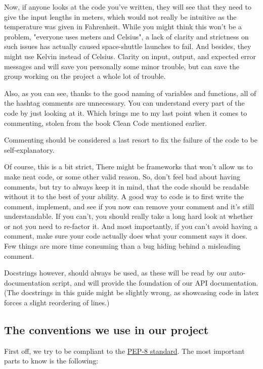 \documentclass[10pt,a4paper]{article}
\begin{document}
Now, if anyone looks at the code you've written, they will see that they need to give the input lengths in meters, which would not really be intuitive as the temperature was given in Fahrenheit. While you might think this won't be a problem, "everyone uses meters and Celsius", a lack of clarity and strictness on such issues has actually caused space-shuttle launches to fail. And besides, they might use Kelvin instead of Celsius. Clarity on input, output, and expected error messages and will save you personally some minor trouble, but can save the group working on the project a whole lot of trouble. 

Also, as you can see, thanks to the good naming of variables and functions, all of the hashtag comments are unnecessary. You can understand every part of the code by just looking at it. Which brings me to my last point when it comes to commenting, stolen from the book Clean Code mentioned earlier.

Commenting should be considered a last resort to fix the failure of the code to be self-explanatory.

Of course, this is a bit strict, There might be frameworks that won't allow us to make neat code, or some other valid reason. So, don't feel bad about having comments, but try to always keep it in mind, that the code should be readable without it to the best of your ability. A good way to code is to first write the comment, implement, and see if you now can remove your comment and it's still understandable. If you can't, you should really take a long hard look at whether or not you need to re-factor it. And most importantly, if you can't avoid having a comment, make sure your code actually does what your comment says it does. Few things are more time consuming than a bug hiding behind a misleading comment. 

Docstrings however, should always be used, as these will be read by our auto-documentation script, and will provide the foundation of our API documentation. (The docstrings in this guide might be slightly wrong, as showcasing code in latex forces a slight reordering of lines.)

\subsection{The conventions we use in our project}

First off, we try to be compliant to the \href{https://www.python.org/dev/peps/pep-0008/}{PEP-8 standard}. The most important parts to know is the following:
\end{document}
